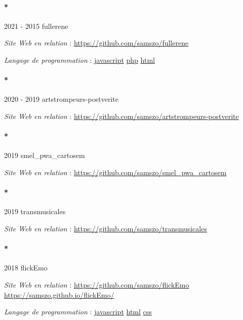 \documentclass[
  a4paper,
  DIV=11,
  numbers=noendperiod]{scrreprt}
\let\oldparagraph\paragraph
\renewcommand{\paragraph}[1]{\oldparagraph{#1}\mbox{}}
\begin{document}
\paragraph*{2021 - 2015 fullerene}\label{sec-item301780}

\emph{Site Web en relation} : \url{https://github.com/samszo/fullerene}

\emph{Langage de programmation} :
\href{http://localhost/samszo/omk/s/fiches/item/89711}{javascript}
\href{http://localhost/samszo/omk/s/fiches/item/108369}{php}
\href{http://localhost/samszo/omk/s/fiches/item/96621}{html}

\paragraph*{2020 - 2019 artstrompeurs-postverite}\label{sec-item301839}

\emph{Site Web en relation} :
\url{https://github.com/samszo/artstrompeurs-postverite}

\paragraph*{2019 smel\_pwa\_cartosem}\label{sec-item301823}

\emph{Site Web en relation} :
\url{https://github.com/samszo/smel_pwa_cartosem}

\paragraph*{2019 transmusicales}\label{sec-item301824}

\emph{Site Web en relation} :
\url{https://github.com/samszo/transmusicales}

\paragraph*{2018 flickEmo}\label{sec-item301814}

\emph{Site Web en relation} : \url{https://github.com/samszo/flickEmo}
\url{https://samszo.github.io/flickEmo/}

\emph{Langage de programmation} :
\href{http://localhost/samszo/omk/s/fiches/item/89711}{javascript}
\href{http://localhost/samszo/omk/s/fiches/item/96621}{html}
\href{http://localhost/samszo/omk/s/fiches/item/102418}{css}
\end{document}

